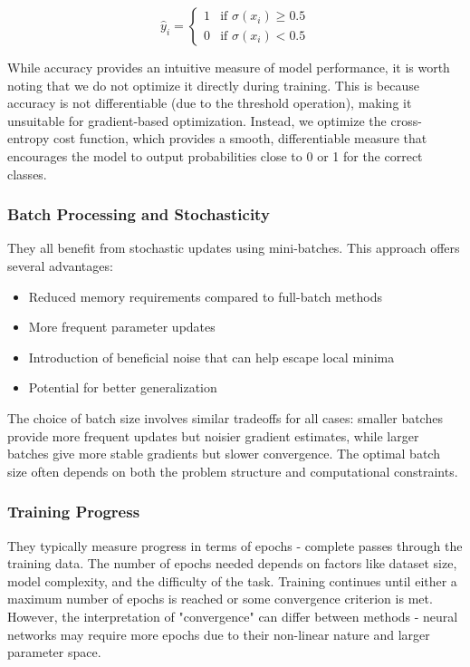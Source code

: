 \documentclass[aps,pra,english,notitlepage,reprint,nofootinbib]{revtex4-1}  %
\begin{document}
\begin{equation}
    \hat{y}_i =
    \begin{cases}
        1 & \text{if } \sigma(x_i) \geq 0.5 \\
        0 & \text{if } \sigma(x_i) < 0.5
    \end{cases}
\end{equation}

While accuracy provides an intuitive measure of model performance, it is worth noting that we do not optimize it directly during training. This is because accuracy is not differentiable (due to the threshold operation), making it unsuitable for gradient-based optimization. Instead, we optimize the cross-entropy cost function, which provides a smooth, differentiable measure that encourages the model to output probabilities close to 0 or 1 for the correct classes.

\subsubsection{Batch Processing and Stochasticity}
They all benefit from stochastic updates using mini-batches. This approach offers several advantages:

\begin{itemize}
    \item Reduced memory requirements compared to full-batch methods
    \item More frequent parameter updates
    \item Introduction of beneficial noise that can help escape local minima
    \item Potential for better generalization
\end{itemize}

The choice of batch size involves similar tradeoffs for all cases: smaller batches provide more frequent updates but noisier gradient estimates, while larger batches give more stable gradients but slower convergence. The optimal batch size often depends on both the problem structure and computational constraints.

\subsubsection{Training Progress}
They typically measure progress in terms of epochs - complete passes through the training data. The number of epochs needed depends on factors like dataset size, model complexity, and the difficulty of the task. Training continues until either a maximum number of epochs is reached or some convergence criterion is met. However, the interpretation of "convergence" can differ between methods - neural networks may require more epochs due to their non-linear nature and larger parameter space.
\end{document}
